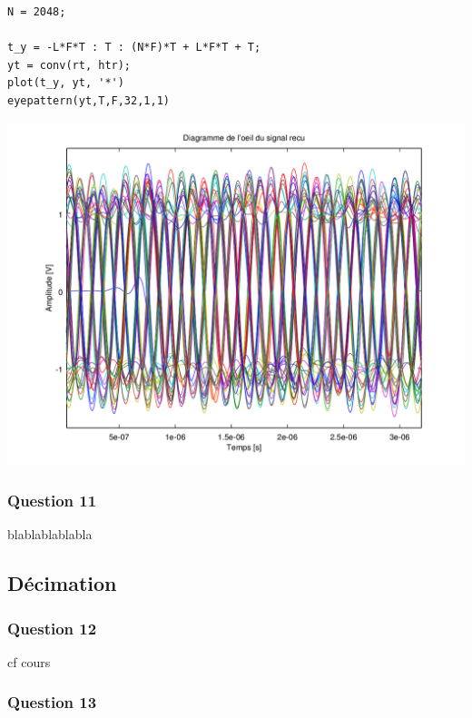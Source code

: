 \documentclass{acm_proc_article-sp}
\begin{document}
\begin{center}
\begin{lstlisting}
N = 2048;

t_y = -L*F*T : T : (N*F)*T + L*F*T + T;
yt = conv(rt, htr);
plot(t_y, yt, '*')
eyepattern(yt,T,F,32,1,1)
\end{lstlisting}

\includegraphics[scale=0.45]{oeil.png}
\end{center}
\subsubsection{Question 11}

blablablablabla

\subsection{Décimation}

\subsubsection{Question 12}

cf cours

\subsubsection{Question 13}
\end{document}
